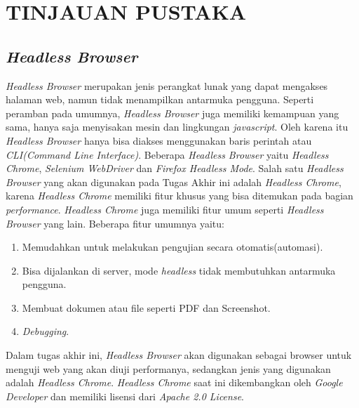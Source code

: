 \chapter{TINJAUAN PUSTAKA}
	\section{\textit{Headless Browser}}
		\textit{Headless Browser} merupakan jenis perangkat lunak yang dapat mengakses halaman web, namun tidak menampilkan antarmuka pengguna. Seperti peramban pada umumnya, \textit{Headless Browser} juga memiliki kemampuan yang sama, hanya saja menyisakan mesin dan lingkungan \textit{javascript}. Oleh karena itu \textit{Headless Browser} hanya bisa diakses menggunakan baris perintah atau \textit{CLI(Command Line Interface)}\cite{headless_browser}. Beberapa \textit{Headless Browser} yaitu \textit{Headless Chrome}, \textit{Selenium WebDriver} dan \textit{Firefox Headless Mode}. Salah satu \textit{Headless Browser} yang akan digunakan pada Tugas Akhir ini adalah \textit{Headless Chrome}, karena \textit{Headless Chrome} memiliki fitur khusus yang bisa ditemukan pada bagian \textit{performance}. \textit{Headless Chrome} juga memiliki fitur umum seperti \textit{Headless Browser} yang lain. Beberapa fitur umumnya yaitu\cite{headless_browser_2}:
		
		\begin{enumerate}
			\item Memudahkan untuk melakukan pengujian secara otomatis(automasi).
			\item Bisa dijalankan di server, mode \textit{headless} tidak membutuhkan antarmuka pengguna.
			\item Membuat dokumen atau file seperti PDF dan Screenshot.
			\item \textit{Debugging}.\\
		\end{enumerate}

		\indent Dalam tugas akhir ini, \textit{Headless Browser} akan digunakan sebagai browser untuk menguji web yang akan diuji performanya, sedangkan jenis yang digunakan adalah \textit{Headless Chrome}. \textit{Headless Chrome} saat ini dikembangkan oleh \textit{Google Developer} dan memiliki lisensi dari \textit{Apache 2.0 License}.
			
